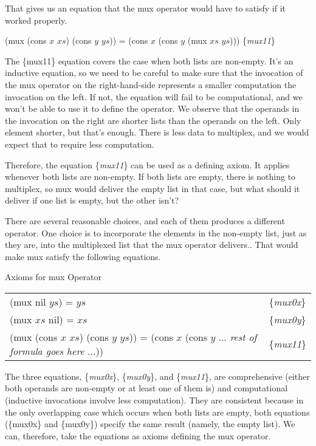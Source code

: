 That gives us an equation that the mux operator
would have to satisfy if it worked properly.

\hspace{1cm} (mux (cons $x$ $xs$) (cons $y$ $ys$)) = (cons $x$ (cons $y$ (mux $xs$ $ys$)))
\hfill \{\emph{mux11}\}

The \{mux11\} equation covers the case when both lists are non-empty.
It's an inductive equation, so we need to be careful to make sure
that the invocation of the mux operator on the right-hand-side
represents a smaller computation the invocation on the left.
If not, the equation will fail to be computational, and
we won't be able to use it to define the operator.
We observe that the operands in the invocation on the
right are shorter lists than the operands on the left.
Only  element shorter, but that's enough.
There is less data to multiplex,
and we would expect that to require less computation.

Therefore, the equation \{\emph{mux11}\} can be used
as a defining axiom. It applies whenever both lists are non-empty.
If both lists are empty, there is nothing to multiplex,
so mux would deliver the empty list in that case, but
what should it deliver if one list is empty, but the other isn't?

There are several reasonable choices, and each of them produces
a different operator. One choice is to incorporate the elements
in the non-empty list, just as they are, into the
multiplexed list that the mux operator delivers..
That would make mux satisfy the following equations.

\begin{center}
Axioms for mux Operator
\begin{tabular}{ll}
(mux nil $ys$) = $ys$  & \{\emph{mux0x}\}     \\
(mux $xs$ nil) = $xs$  & \{\emph{mux0y}\}     \\
(mux (cons $x$ $xs$) (cons $y$ $ys$)) = (cons $x$ (cons $y$ $\dots$ \emph{rest of formula goes here} $\dots$)) & \{\emph{mux11}\}
\end{tabular}
\end{center}

\label{def:mux}
The three equations, \{\emph{mux0x}\}, \{\emph{mux0y}\}, and \{\emph{mux11}\},
are comprehensive (either both operands are non-empty
or at least one of them is) and computational
(inductive invocations involve less computation).
They are consistent because in the only overlapping case
which occurs
when both lists are empty, both equations
(\{mux0x\} and \{mux0y\}) specify the same result
(namely, the empty list).
We can, therefore, take the equations as axioms
defining the mux operator.

